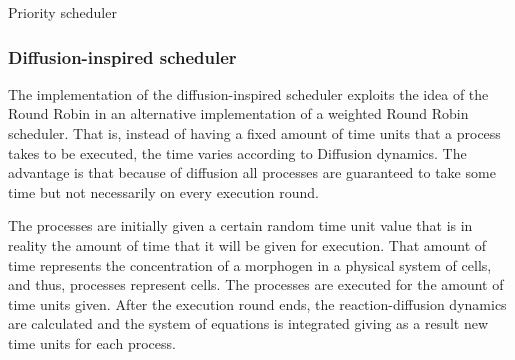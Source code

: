 \begin{algorithm}                      
\caption{Priority scheduler}          
\label{PRSch}                           %
\begin{algorithmic}      
        \ENDIF        
                
        
        \ENDIF
    
    \ENDWHILE
    
\end{algorithmic}
\end{algorithm}
	\subsubsection{Diffusion-inspired scheduler}
\label{disch}
The implementation of the diffusion-inspired scheduler exploits the idea of the Round Robin in an alternative implementation of a weighted Round Robin scheduler. That is, instead of having a fixed amount of time units that a process takes to be executed, the time varies according to Diffusion dynamics. The advantage is that because of diffusion all processes are guaranteed to take some time but not necessarily on every execution round. 

The processes are initially given a certain random time unit value that is in reality the amount of time that it will be given for execution. That amount of time represents the concentration of a morphogen in a physical system of cells, and thus, processes represent cells. The processes are executed for the amount of time units given. After the execution round ends, the reaction-diffusion dynamics are calculated and the system of equations is integrated giving as a result new time units for each process.

